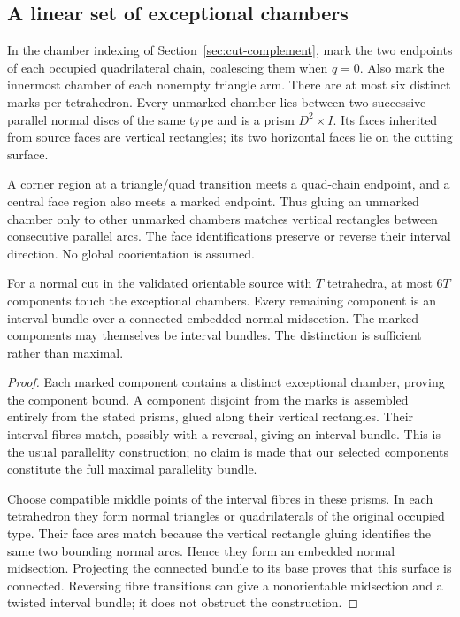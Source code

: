 \subsection{A linear set of exceptional chambers}

In the chamber indexing of Section~\ref{sec:cut-complement}, mark the two
endpoints of each occupied quadrilateral chain, coalescing them when $q=0$.
Also mark the innermost chamber of each nonempty triangle arm. There are at
most six distinct marks per tetrahedron. Every unmarked chamber lies between
two successive parallel normal discs of the same type and is a prism
$D^2\times I$. Its faces inherited from source faces are vertical rectangles;
its two horizontal faces lie on the cutting surface.

A corner region at a triangle/quad transition meets a quad-chain endpoint,
and a central face region also meets a marked endpoint. Thus gluing an
unmarked chamber only to other unmarked chambers matches vertical rectangles
between consecutive parallel arcs. The face identifications preserve or
reverse their interval direction. No global coorientation is assumed.

\begin{proposition}
For a normal cut in the validated orientable source with $T$ tetrahedra,
at most $6T$ components touch the exceptional chambers. Every remaining
component is an interval bundle over a connected embedded normal midsection.
The marked components may themselves be interval bundles. The distinction
is sufficient rather than maximal.
\end{proposition}
\begin{proof}
Each marked component contains a distinct exceptional chamber, proving the
component bound. A component disjoint from the marks is assembled entirely
from the stated prisms, glued along their vertical rectangles. Their interval
fibres match, possibly with a reversal, giving an interval bundle. This is
the usual parallelity construction; no claim is made that our selected
components constitute the full maximal parallelity bundle.

Choose compatible middle points of the interval fibres in these prisms. In each tetrahedron they
form normal triangles or quadrilaterals of the original occupied type.
Their face arcs match because the vertical rectangle gluing identifies the
same two bounding normal arcs. Hence they form an embedded normal midsection.
Projecting the connected bundle to its base proves that this surface is
connected. Reversing fibre transitions can give a nonorientable midsection
and a twisted interval bundle; it does not obstruct the construction.
\end{proof}

